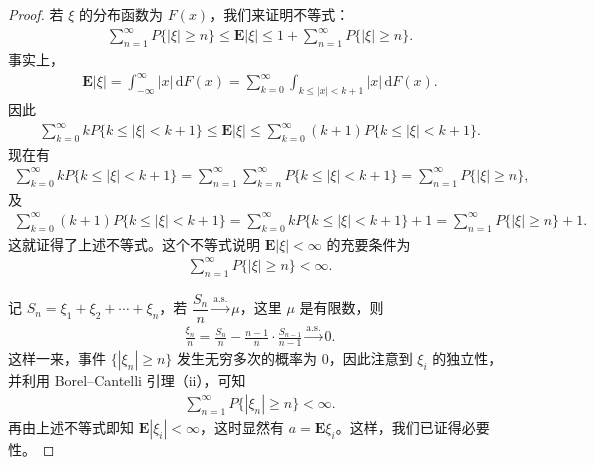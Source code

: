 \documentclass[../../main.tex]{subfiles}
\begin{document}
\begin{proof}
若 $\xi$ 的分布函数为 $F(x)$，我们来证明不等式：
\begin{align}
\sum_{n=1}^{\infty}P\{|\xi|\geqslant n\}\leqslant\boldsymbol{E}|\xi|\leqslant1+\sum_{n=1}^{\infty}P\{|\xi|\geqslant n\}.
\end{align}
事实上，
\begin{align*}
\boldsymbol{E}|\xi|=\int_{-\infty}^{\infty}|x|\,\mathrm{d}F(x)=\sum_{k=0}^{\infty}\int_{k\leqslant|x|<k+1}|x|\,\mathrm{d}F(x).
\end{align*}
因此
\begin{align*}
\sum_{k=0}^{\infty}kP\{k\leqslant|\xi|<k+1\}\leqslant\boldsymbol{E}|\xi|
\leqslant\sum_{k=0}^{\infty}(k+1)P\{k\leqslant|\xi|<k+1\}.
\end{align*}
现在有
\begin{align*}
\sum_{k=0}^{\infty}kP\{k\leqslant|\xi|<k+1\}
=\sum_{n=1}^{\infty}\sum_{k=n}^{\infty}P\{k\leqslant|\xi|<k+1\}
=\sum_{n=1}^{\infty}P\{|\xi|\geqslant n\},
\end{align*}
及
\begin{align*}
\sum_{k=0}^{\infty}(k+1)P\{k\leqslant|\xi|<k+1\}
=\sum_{k=0}^{\infty}kP\{k\leqslant|\xi|<k+1\}+1
=\sum_{n=1}^{\infty}P\{|\xi|\geqslant n\}+1.
\end{align*}
这就证得了上述不等式。这个不等式说明 $\boldsymbol{E}|\xi|<\infty$ 的充要条件为
\begin{align*}
\sum_{n=1}^{\infty}P\{|\xi|\geqslant n\}<\infty.
\end{align*}

记 $S_n=\xi_1+\xi_2+\cdots+\xi_n$，若 $\dfrac{S_n}{n}\xrightarrow{\mathrm{a.s.}}\mu$，这里 $\mu$ 是有限数，则
\begin{align}
\frac{\xi_n}{n}=\frac{S_n}{n}-\frac{n-1}{n}\cdot\frac{S_{n-1}}{n-1}\xrightarrow{\mathrm{a.s.}}0.
\end{align}
这样一来，事件 $\{|\xi_n|\geqslant n\}$ 发生无穷多次的概率为 $0$，因此注意到 $\xi_i$ 的独立性，并利用 Borel--Cantelli 引理（ii），可知
\begin{align*}
\sum_{n=1}^{\infty}P\{|\xi_n|\geqslant n\}<\infty.
\end{align*}
再由上述不等式即知 $\boldsymbol{E}|\xi_i|<\infty$，这时显然有 $a=\boldsymbol{E}\xi_i$。这样，我们已证得必要性。


\end{proof}
\end{document}
